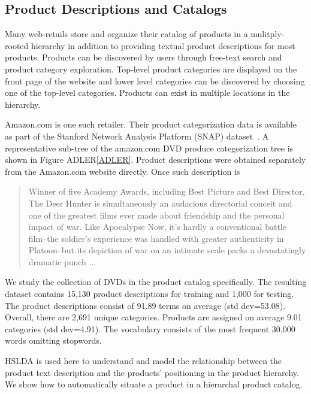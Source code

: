 \subsection{Product Descriptions and Catalogs}

Many web-retails store and organize their catalog of products in a
mulitply-rooted hierarchy in addition to providing textual product descriptions 
for most products. Products can be discovered by users
through free-text search and product category exploration. Top-level
product categories are displayed on the front page of the website and lower
level categories can be discovered by choosing one of the top-level categories.
Products can exist in multiple locations in the hierarchy.

Amazon.com is one such retailer.  Their product categorization data is available as part of the 
 Stanford Network Analysis Platform (SNAP) dataset~\cite{SNAP}.    A representative sub-tree of the amazon.com DVD produce categorization tree is shown in Figure ADLER\ref{ADLER}.  
Product descriptions were obtained separately from the
Amazon.com website directly. Once such description is
\begin{quote}
{Winner of five Academy Awards, including Best Picture and Best Director, The Deer Hunter 
is simultaneously an audacious directorial conceit and one of the greatest films ever made 
about friendship and the personal impact of war. Like Apocalypse Now, it's hardly a conventional 
battle film--the soldier's experience was handled with greater authenticity in Platoon--but its 
depiction of war on an intimate scale packs a devastatingly dramatic punch ... }
\end{quote}
We study the collection of DVDs
in the product catalog specifically.
The resulting dataset contains 15,130 product descriptions for training and 1,000
for testing. The product descriptions consist of
91.89 terms on average (std dev=53.08). Overall, there are 2,691 unique categories.
Products are assigned on average 9.01 categories (std dev=4.91). The vocabulary
consists of the most frequent 30,000 words omitting stopwords. 

HSLDA is used here to understand and model the relationship between the product text description and the products' positioning in the product hierarchy.  We show how to automatically situate a product in a hierarchal product catalog.  



